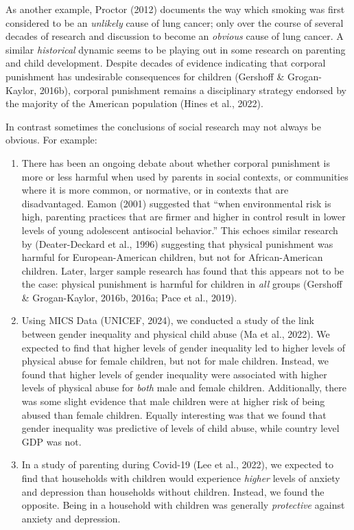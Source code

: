 \documentclass[
  letterpaper,
  DIV=11,
  numbers=noendperiod]{scrreprt}
\providecommand{\tightlist}{%
  \setlength{\itemsep}{0pt}\setlength{\parskip}{0pt}}\usepackage{longtable,booktabs,array}
\begin{document}
As another example, Proctor (2012) documents the way which smoking was
first considered to be an \emph{unlikely} cause of lung cancer; only
over the course of several decades of research and discussion to become
an \emph{obvious} cause of lung cancer. A similar \emph{historical}
dynamic seems to be playing out in some research on parenting and child
development. Despite decades of evidence indicating that corporal
punishment has undesirable consequences for children (Gershoff \&
Grogan-Kaylor, 2016b), corporal punishment remains a disciplinary
strategy endorsed by the majority of the American population (Hines et
al., 2022).

In contrast sometimes the conclusions of social research may not always
be obvious. For example:

\begin{enumerate}
\def\labelenumi{\arabic{enumi}.}
\tightlist
\item
  There has been an ongoing debate about whether corporal punishment is
  more or less harmful when used by parents in social contexts, or
  communities where it is more common, or normative, or in contexts that
  are disadvantaged. Eamon (2001) suggested that ``when environmental
  risk is high, parenting practices that are firmer and higher in
  control result in lower levels of young adolescent antisocial
  behavior.'' This echoes similar research by (Deater-Deckard et al.,
  1996) suggesting that physical punishment was harmful for
  European-American children, but not for African-American children.
  Later, larger sample research has found that this appears not to be
  the case: physical punishment is harmful for children in \emph{all}
  groups (Gershoff \& Grogan-Kaylor, 2016b, 2016a; Pace et al., 2019).
\item
  Using MICS Data (UNICEF, 2024), we conducted a study of the link
  between gender inequality and physical child abuse (Ma et al., 2022).
  We expected to find that higher levels of gender inequality led to
  higher levels of physical abuse for female children, but not for male
  children. Instead, we found that higher levels of gender inequality
  were associated with higher levels of physical abuse for \emph{both}
  male and female children. Additionally, there was some slight evidence
  that male children were at higher risk of being abused than female
  children. Equally interesting was that we found that gender inequality
  was predictive of levels of child abuse, while country level GDP was
  not.
\item
  In a study of parenting during Covid-19 (Lee et al., 2022), we
  expected to find that households with children would experience
  \emph{higher} levels of anxiety and depression than households without
  children. Instead, we found the opposite. Being in a household with
  children was generally \emph{protective} against anxiety and
  depression.
\end{enumerate}
\end{document}
